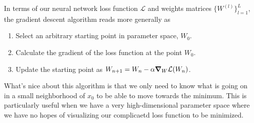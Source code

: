 In terms of our neural network loss function $\mathcal{L}$ and weights matrices $\{W^{(l)}\}_{l=1}^{L}$, the gradient descent algorithm reads more generally as
\begin{enumerate}
    \item Select an arbitrary starting point in parameter space, $W_0$.
    \item Calculate the gradient of the loss function at the point $W_0$.
    \item Update the starting point as $W_{n + 1} = W_n - \alpha \mbox{\boldmath$ \nabla $} _W \mathcal{L}(W_n)$.
\end{enumerate}

What's nice about this algorithm is that we only need to know what is going on in a small neighborhood of $x_0$ to be able to move towards the minimum.
This is particularly useful when we have a very high-dimensional parameter space where we have no hopes of visualizing our complicaetd loss function to be minimized.
